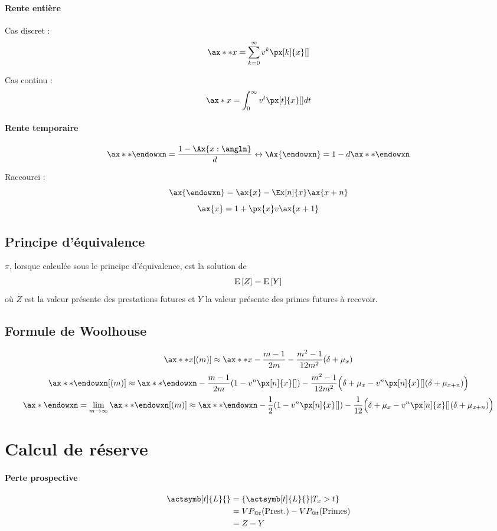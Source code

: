 \documentclass[10pt, french]{article}
\begin{document}
\begin{multicols*}{2}
\paragraph{Rente entière} Cas discret : 
\[\ax**{x} = \sum_{k=0}^{\infty} v^{k} \px[k]{x}[]  \]

Cas continu : 
\[\ax*{x} = \int_{0}^{\infty}  v^t \px[t]{x}[] dt \]

\paragraph{Rente temporaire}
\[\ax**{\endowxn} = \frac{1 - \Ax{x:\angln}}{d} \leftrightarrow \Ax{\endowxn} =1 - d \ax**{\endowxn}\]

Raccourci : 
\[\ax{\endowxn} = \ax{x} - \Ex[n]{x} \ax{x+n}  \]
\[\ax{x} = 1 + \px{x} v \ax{x+1}\]




\subsection*{Principe d'équivalence}
$\pi$, lorsque calculée sous le principe d'équivalence, est la solution de
\[\mathrm{E} \left[ Z \right] = \mathrm{E} \left[ Y \right]\]
où $Z$ est la valeur présente des prestations futures et $Y$ la valeur présente des primes futures à recevoir.

\subsection*{Formule de Woolhouse}
\[\ax**{x}[(m)] \approx \ax**{x} - \frac{m-1}{2m} - \frac{m^2 -1}{12m^2} (\delta + \mu_x)  \]
\[\ax**{\endowxn}[(m)] \approx  \ax**{\endowxn} - \frac{m-1}{2m}(1  -v^n \px[n]{x}[]) - \frac{m^2 -1}{12m^2} \Big( \delta + \mu_x - v^n \px[n]{x}[](\delta + \mu_{x+n}) \Big)  \]
\[\ax*{\endowxn} = \lim_{m \to \infty}  \ax**{\endowxn}[(m)] \approx  \ax**{\endowxn} - \frac{1}{2} (1  -v^n \px[n]{x}[]) - \frac{1}{12} \Big( \delta + \mu_x - v^n \px[n]{x}[](\delta + \mu_{x+n}) \Big)  \]



\section{Calcul de réserve}
\paragraph{Perte prospective}
\begin{align*}
\actsymb[t]{L}{} & = \{ \actsymb[t]{L}{} | T_x > t \} \\
& = VP_{@t}(\text{Prest.}) - VP_{@t}(\text{Primes}) \\
& = Z - Y
\end{align*}


\end{multicols*}
\end{document}
